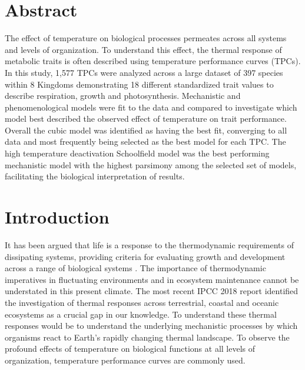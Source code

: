 \documentclass[11pt]{article}
\begin{document}
\tableofcontents
\newpage
\begin{linenumbers}
\section{Abstract}
The effect of temperature on biological processes permeates across all systems and levels of organization. To understand this effect, the thermal response of metabolic traits is often described using temperature performance curves (TPCs). In this study, 1,577 TPCs were analyzed across a large dataset of 397 species within 8 Kingdoms demonstrating 18 different standardized trait values to describe respiration, growth and photosynthesis. Mechanistic and phenomenological models were fit to the data and compared to investigate which model best described the observed effect of temperature on trait performance. Overall the cubic model was identified as having the best fit, converging to all data and most frequently being selected as the best model for each TPC. The high temperature deactivation Schoolfield model was the best performing mechanistic model with the highest parsimony among the selected set of models, facilitating the biological interpretation of results.


\section{Introduction}
It has been argued that life is a response to the thermodynamic requirements of dissipating systems, providing criteria for evaluating growth and development across a range of biological systems \cite{Schneider2007OrderFD}. The importance of thermodynamic imperatives in fluctuating environments and in ecosystem maintenance cannot be understated in this present climate. The most recent IPCC 2018 report \cite{IPCC2018} identified the investigation of thermal responses across terrestrial, coastal and oceanic ecosystems as a crucial gap in our knowledge. To understand these thermal responses would be to understand the underlying mechanistic processes by which organisms react to Earth's rapidly changing thermal landscape. To observe the profound effects of temperature on biological functions at all levels of organization, temperature performance curves are commonly used.


\end{linenumbers}
\end{document}
